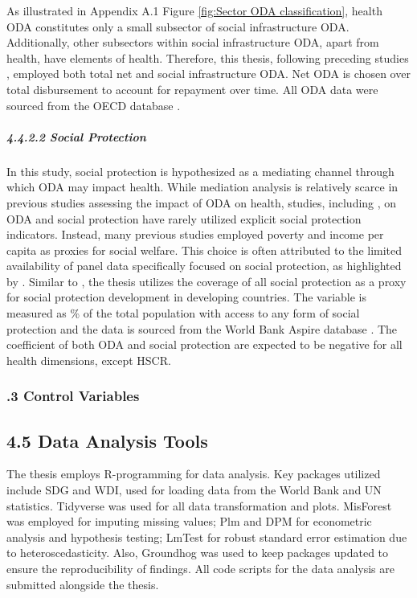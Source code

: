 As illustrated in Appendix A.1 Figure \ref{fig:Sector ODA classification}, health ODA constitutes only a small subsector of social infrastructure ODA. Additionally, other subsectors within social infrastructure ODA, apart from health, have elements of health. Therefore, this thesis, following preceding studies \textcite{williamson_foreign_2008, toseef_how_2019, doucouliagos_health_2021}, employed both total net and social infrastructure ODA. Net ODA is chosen over total disbursement to account for repayment over time. All ODA data were sourced from the OECD database \parencite{oecd_Data_2023}.

\paragraph{\quad \quad \textit{4.4.2.2 Social Protection}}
\subparagraph{}
In this study, social protection is hypothesized as a mediating channel through which ODA may impact health. While mediation analysis is relatively scarce in previous studies assessing the impact of ODA on health, studies, including \textcite[]{mahembe_foreign_2019, forte_impact_2023}, on ODA and social protection have rarely utilized explicit social protection indicators. Instead, many previous studies employed poverty and income per capita as proxies for social welfare. This choice is often attributed to the limited availability of panel data specifically focused on social protection, as highlighted by \textcite{nino-zarazua_aids_2023}. Similar to \textcite{nino-zarazua_aids_2023}, the thesis utilizes the coverage of all social protection as a proxy for social protection development in developing countries. The variable is measured as \% of the total population with access to any form of social protection and the data is sourced from the World Bank Aspire database \parencite{wdi_world_2023}. The coefficient of both ODA and social protection are expected to be negative for all health dimensions, except HSCR.  
 
\subsubsection*{.3 Control Variables}


\subsection*{4.5 Data Analysis Tools}
The thesis employs R-programming for data analysis. Key packages utilized include SDG and WDI,  used for loading data from the World Bank and UN statistics. Tidyverse was used for all data transformation and plots. MisForest was employed for imputing missing values; Plm and DPM for econometric analysis and hypothesis testing; LmTest for robust standard error estimation due to heteroscedasticity. Also, Groundhog was used to keep packages updated to ensure the reproducibility of findings. All code scripts for the data analysis are submitted alongside the thesis. 






